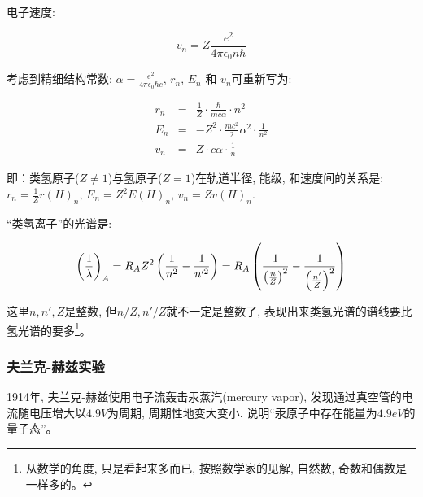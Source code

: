 电子速度:

\begin{equation*}
v_n = Z \frac{e^2}{4 \pi \epsilon_0 n \hbar}
\end{equation*}


考虑到精细结构常数:  $\alpha = \frac{e^2}{4\pi \epsilon_0 \hbar c}
$, $r_n$, $E_n$ 和 $v_n$可重新写为:

\begin{eqnarray*}
  r_n &=& \frac{1}{Z} \cdot \frac{ \hbar}{m c \alpha} \cdot n^2 \\
  E_n &=& - Z^2 \cdot \frac{mc^2}{2} \alpha^2 \cdot \frac{1}{n^2} \\
  v_n &=& Z \cdot c \alpha \cdot \frac{1}{n}
\end{eqnarray*}


即：类氢原子($Z \ne 1$)与氢原子($Z=1$)在轨道半径, 能级,
和速度间的关系是: $r_n = \frac{1}{Z} r(H)_n $, $E_n = Z^2 E(H)_n$,
$v_n = Z v(H)_n$.

``类氢离子''的光谱是:

\begin{equation}\label{Hydrogen-like atoms}
\left( {\frac{1}{\lambda }} \right)_A  = R_A Z^2 \left(
{\frac{1}{{n^2 }} - \frac{1}{{n'^2 }}} \right) = R_A \left(
{\frac{1}{{\left( {{\textstyle{n \over Z}}} \right)^2 }} -
\frac{1}{{\left( {{\textstyle{{n'} \over Z}}} \right)^2 }}} \right)
\end{equation}

这里$n,n',Z$是整数, 但$n/Z,n'/Z$就不一定是整数了,
表现出来类氢光谱的谱线要比氢光谱的要多\footnote{从数学的角度,
只是看起来多而已, 按照数学家的见解, 自然数,
奇数和偶数是一样多的。}。


\subsubsection{夫兰克-赫兹实验}

1914年, 夫兰克-赫兹使用电子流轰击汞蒸汽(mercury vapor),
发现通过真空管的电流随电压增大以$4.9V$为周期, 周期性地变大变小.
说明``汞原子中存在能量为$4.9eV$的量子态''。


